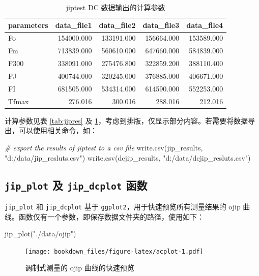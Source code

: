 \documentclass[
]{krantz}
\makeatletter
\newenvironment{Shaded}{\begin{snugshade}}{\end{snugshade}}
\newcommand{\CommentTok}[1]{\textcolor[rgb]{0.56,0.35,0.01}{\textit{#1}}}
\newcommand{\FunctionTok}[1]{\textcolor[rgb]{0.00,0.00,0.00}{#1}}
\newcommand{\NormalTok}[1]{#1}
\newcommand{\StringTok}[1]{\textcolor[rgb]{0.31,0.60,0.02}{#1}}
\newenvironment{kframe}{%
\medskip{}
\setlength{\fboxsep}{.8em}
 \def\at@end@of@kframe{}%
 \ifinner\ifhmode%
  \def\at@end@of@kframe{\end{minipage}}%
  \begin{minipage}{\columnwidth}%
 \fi\fi%
 \def\FrameCommand##1{\hskip\@totalleftmargin \hskip-\fboxsep
 \colorbox{shadecolor}{##1}\hskip-\fboxsep
     \hskip-\linewidth \hskip-\@totalleftmargin \hskip\columnwidth}%
 \MakeFramed {\advance\hsize-\width
   \@totalleftmargin\z@ \linewidth\hsize
   \@setminipage}}%
 {\par\unskip\endMakeFramed%
 \at@end@of@kframe}
\renewenvironment{Shaded}{\begin{kframe}}{\end{kframe}}
\makeatother
\begin{document}
\begin{longtable}[t]{lrrrr}
\caption{\label{tab:dcjipres}jiptest DC 数据输出的计算参数}\\
\toprule
parameters & data\_file1 & data\_file2 & data\_file3 & data\_file4\\
\midrule
Fo & 154000.000 & 133191.000 & 156664.000 & 153589.000\\
Fm & 713839.000 & 560610.000 & 647660.000 & 584839.000\\
F300 & 338091.000 & 275476.800 & 322859.200 & 388110.400\\
FJ & 400744.000 & 320245.000 & 376885.000 & 406671.000\\
FI & 681505.000 & 534314.000 & 614590.000 & 552253.000\\
\addlinespace
Tfmax & 276.016 & 300.016 & 288.016 & 212.016\\
\bottomrule
\end{longtable}

计算参数见表 \ref{tab:jipres} 及 \ref{tab:dcjipres}，考虑到排版，仅显示部分内容。若需要将数据导出，可以使用相关命令，如：

\begin{Shaded}
\begin{Highlighting}[]
\CommentTok{\# export the results of jiptest to a csv file}
\FunctionTok{write.csv}\NormalTok{(jip\_results, }\StringTok{"d:/data/jip\_resluts.csv"}\NormalTok{)}
\FunctionTok{write.csv}\NormalTok{(dcjip\_results, }\StringTok{"d:/data/dcjip\_resluts.csv"}\NormalTok{)}
\end{Highlighting}
\end{Shaded}

\hypertarget{plotfluor}{%
\subsection{\texorpdfstring{\texttt{jip\_plot} 及 \texttt{jip\_dcplot} 函数}{jip\_plot 及 jip\_dcplot 函数}}\label{plotfluor}}

\texttt{jip\_plot} 和 \texttt{jip\_dcplot} 基于 \texttt{ggplot2}，用于快速预览所有测量结果的 ojip 曲线。函数仅有一个参数，即保存数据文件夹的路径，使用如下：

\begin{Shaded}
\begin{Highlighting}[]
\FunctionTok{jip\_plot}\NormalTok{(}\StringTok{"./data/ojip"}\NormalTok{)}
\end{Highlighting}
\end{Shaded}

\begin{figure}
\centering
\texttt{[image: bookdown\_files/figure-latex/acplot-1.pdf]}
\caption{\label{fig:acplot}调制式测量的 ojip 曲线的快速预览}
\end{figure}
\end{document}
